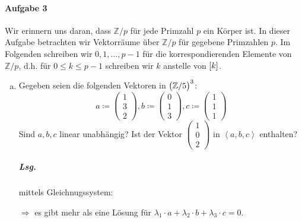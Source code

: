\documentclass{scrreprt}
\newcommand\hull[1]{\left\langle #1 \right\rangle}
\begin{document}
\paragraph{Aufgabe 3}
Wir erinnern uns daran, dass $\mathbb{Z}/p$ für jede Primzahl $p$ ein Körper ist.
In dieser Aufgabe betrachten wir Vektorräume über $\mathbb{Z}/p$ für gegebene
Primzahlen $p$.
Im Folgenden schreiben wir $0, 1, \ldots, p - 1$ für die korrespondierenden
Elemente von $\mathbb{Z}/p$, d.h. für $0 \leq k \leq p - 1$ schreiben wir $k$
anstelle von $\qty[k]$.
\begin{enumerate}[(a)]
\item Gegeben seien die folgenden Vektoren in $\qty\big(\mathbb{Z}/5)^3$:
  \[
    a \coloneqq \begin{pmatrix}
      1 \\
      3 \\
      2
    \end{pmatrix},
    b \coloneqq \begin{pmatrix}
      0 \\
      1 \\
      3
    \end{pmatrix},
    c \coloneqq \begin{pmatrix}
      1 \\
      1 \\
      1
    \end{pmatrix}
  \]
  Sind $a, b, c$ linear unabhängig?
  Ist der Vektor $\begin{pmatrix} 1 \\ 0 \\ 2\end{pmatrix}$ in $\hull{a, b, c}$
  enthalten?

  \subparagraph{Lsg.} mittels Gleichnugssystem:
  $\Rightarrow$ es gibt mehr als eine Lösung für
  $\lambda_1 \cdot a + \lambda_2 \cdot b + \lambda_3 \cdot c = 0$.


\end{enumerate}
\end{document}
